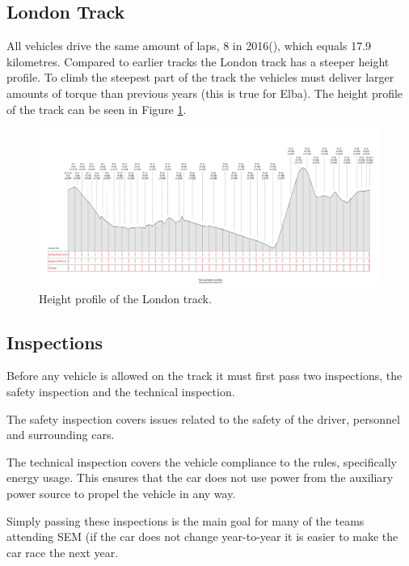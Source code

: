 \subsection{London Track}
All vehicles drive the same amount of laps, 8 in 2016(\cite{semrules16c2}), which equals 17.9 kilometres. Compared to earlier tracks the London track has a steeper height profile. To climb the steepest part of the track the vehicles must deliver larger amounts of torque than previous years (this is true for Elba). The height profile of the track can be seen in Figure \ref{fig:introduction_londontrack}.

\begin{figure}[H]
    \label{fig:introduction_londontrack}
    \centering
    \includegraphics[width=\textwidth]{./img/introduction_londontrack.png}
    \caption{Height profile of the London track.}
\end{figure}

\subsection{Inspections}
Before any vehicle is allowed on the track it must first pass two inspections, the safety inspection and the technical inspection.

The safety inspection covers issues related to the safety of the driver, personnel and surrounding cars. 

The technical inspection covers the vehicle compliance to the rules, specifically energy usage. This ensures that the car does not use power from the auxiliary power source to propel the vehicle in any way.

Simply passing these inspections is the main goal for many of the teams attending SEM (if the car does not change year-to-year it is easier to make the car race the next year.
